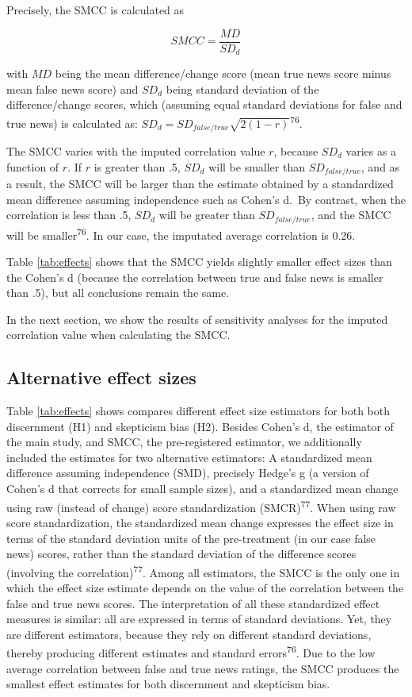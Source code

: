 \documentclass[
  doc,floatsintext]{apa6}
\begin{document}
Precisely, the SMCC is calculated as

\[
SMCC = \frac{MD}{SD_d}
\]

with \(MD\) being the mean difference/change score (mean true news score minus mean false news score) and \(SD_d\) being standard deviation of the difference/change scores, which (assuming equal standard deviations for false and true news) is calculated as: \(SD_d = SD_{false/true}\sqrt{2(1-r)}\)\textsuperscript{76}.

The SMCC varies with the imputed correlation value \(r\), because \(SD_d\) varies as a function of \(r\). If \(r\) is greater than .5, \(SD_d\) will be smaller than \(SD_{false/true}\), and as a result, the SMCC will be larger than the estimate obtained by a standardized mean difference assuming independence such as Cohen's d.~By contrast, when the correlation is less than .5, \(SD_d\) will be greater than \(SD_{false/true}\), and the SMCC will be smaller\textsuperscript{76}. In our case, the imputated average correlation is 0.26.

Table \ref{tab:effects} shows that the SMCC yields slightly smaller effect sizes than the Cohen's d (because the correlation between true and false news is smaller than .5), but all conclusions remain the same.

In the next section, we show the results of sensitivity analyses for the imputed correlation value when calculating the SMCC.

\subsection{Alternative effect sizes}\label{alternative-effect-sizes}

Table \ref{tab:effects} shows compares different effect size estimators for both both discernment (H1) and skepticism bias (H2). Besides Cohen's d, the estimator of the main study, and SMCC, the pre-registered estimator, we additionally included the estimates for two alternative estimators: A standardized mean difference assuming independence (SMD), precisely Hedge's g (a version of Cohen's d that corrects for small sample sizes), and a standardized mean change using raw (instead of change) score standardization (SMCR)\textsuperscript{77}. When using raw score standardization, the standardized mean change expresses the effect size in terms of the standard deviation units of the pre-treatment (in our case false news) scores, rather than the standard deviation of the difference scores (involving the correlation)\textsuperscript{77}. Among all estimators, the SMCC is the only one in which the effect size estimate depends on the value of the correlation between the false and true news scores. The interpretation of all these standardized effect measures is similar: all are expressed in terms of standard deviations. Yet, they are different estimators, because they rely on different standard deviations, thereby producing different estimates and standard errors\textsuperscript{76}. Due to the low average correlation between false and true news ratings, the SMCC produces the smallest effect estimates for both discernment and skepticism bias.
\end{document}
